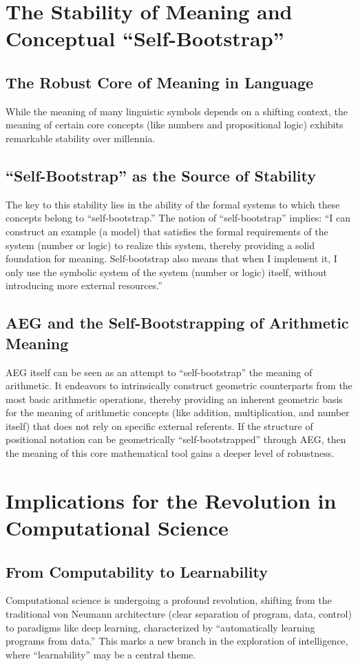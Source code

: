 \documentclass{article}
\begin{document}
\section{The Stability of Meaning and Conceptual ``Self-Bootstrap''}

\subsection{The Robust Core of Meaning in Language}
While the meaning of many linguistic symbols depends on a shifting context, the meaning of certain core concepts (like numbers and propositional logic) exhibits remarkable stability over millennia.

\subsection{``Self-Bootstrap'' as the Source of Stability}
The key to this stability lies in the ability of the formal systems to which these concepts belong to ``self-bootstrap.''
The notion of ``self-bootstrap'' implies: ``I can construct an example (a model) that satisfies the formal requirements of the system (number or logic) to realize this system, thereby providing a solid foundation for meaning. Self-bootstrap also means that when I implement it, I only use the symbolic system of the system (number or logic) itself, without introducing more external resources.''

\subsection{AEG and the Self-Bootstrapping of Arithmetic Meaning}
AEG itself can be seen as an attempt to ``self-bootstrap'' the meaning of arithmetic. It endeavors to intrinsically construct geometric counterparts from the most basic arithmetic operations, thereby providing an inherent geometric basis for the meaning of arithmetic concepts (like addition, multiplication, and number itself) that does not rely on specific external referents.
If the structure of positional notation can be geometrically ``self-bootstrapped'' through AEG, then the meaning of this core mathematical tool gains a deeper level of robustness.

\section{Implications for the Revolution in Computational Science}

\subsection{From Computability to Learnability}
Computational science is undergoing a profound revolution, shifting from the traditional von Neumann architecture (clear separation of program, data, control) to paradigms like deep learning, characterized by ``automatically learning programs from data.'' This marks a new branch in the exploration of intelligence, where ``learnability'' may be a central theme.
\end{document}
